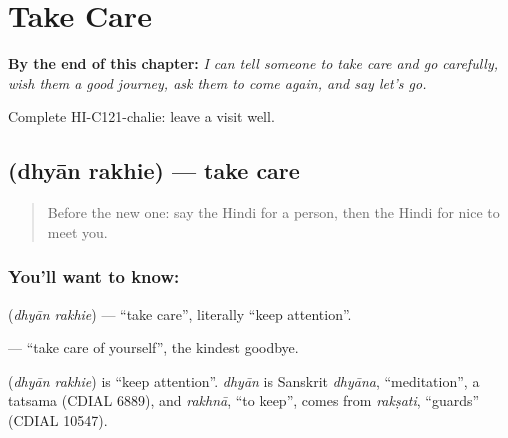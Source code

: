 
\chapter{Take Care}
\label{ch:hi-take-care}

\begin{chapteropening}
\textbf{By the end of this chapter:} \emph{I can tell someone to take care and go carefully, wish them a good journey, ask them to come again, and say let's go.}

Complete HI-C121-chalie: leave a visit well.
\end{chapteropening}

\section[\texorpdfstring{\hi{ध्यान} \hi{रखिए} (dhyān rakhie)}{ध्यान रखिए (dhyān rakhie)}]{  (dhyān rakhie) — take care}

\label{lesson:HI-C121-dhyanrakhie}



\begin{quote}
Before the new one: say the Hindi for a person, then the Hindi for nice to meet you.
\end{quote}

\subsection*{You'll want to know:  }
\textbf{ } (\emph{dhyān rakhie}) — \textquotedblleft{}take care\textquotedblright{}, literally \textquotedblleft{}keep attention\textquotedblright{}.

\textbf{  } — \textquotedblleft{}take care of yourself\textquotedblright{}, the kindest goodbye.

\begin{cousinweb}
\textbf{ } (\emph{dhyān rakhie}) is \textquotedblleft{}keep attention\textquotedblright{}. \emph{dhyān} is Sanskrit \emph{dhyāna}, \textquotedblleft{}meditation\textquotedblright{}, a tatsama (CDIAL 6889), and \emph{rakhnā}, \textquotedblleft{}to keep\textquotedblright{}, comes from \emph{rakṣati}, \textquotedblleft{}guards\textquotedblright{} (CDIAL 10547).
\end{cousinweb}

